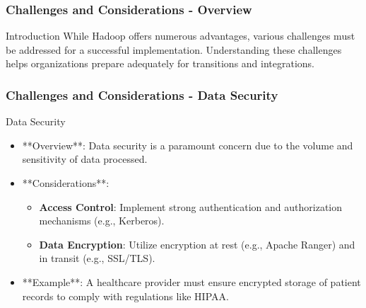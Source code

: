 \documentclass[aspectratio=169]{beamer}
\begin{document}
\begin{frame}[fragile]
    \frametitle{Challenges and Considerations - Overview}
    \begin{block}{Introduction}
        While Hadoop offers numerous advantages, various challenges must be addressed for a successful implementation. 
        Understanding these challenges helps organizations prepare adequately for transitions and integrations.
    \end{block}
\end{frame}

\begin{frame}[fragile]
    \frametitle{Challenges and Considerations - Data Security}
    \begin{block}{Data Security}
        \begin{itemize}
            \item **Overview**: Data security is a paramount concern due to the volume and sensitivity of data processed.
            \item **Considerations**:
                \begin{itemize}
                    \item \textbf{Access Control}: Implement strong authentication and authorization mechanisms (e.g., Kerberos).
                    \item \textbf{Data Encryption}: Utilize encryption at rest (e.g., Apache Ranger) and in transit (e.g., SSL/TLS). 
                \end{itemize}
            \item **Example**: A healthcare provider must ensure encrypted storage of patient records to comply with regulations like HIPAA.
        \end{itemize}
    \end{block}
\end{frame}
\end{document}
